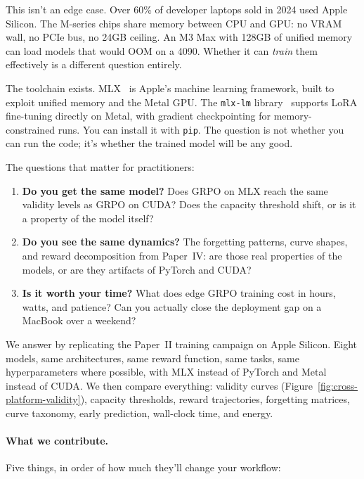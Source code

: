 \documentclass[11pt]{article}
\begin{document}
This isn't an edge case.  Over 60\% of developer laptops sold in 2024 used Apple Silicon.  The M-series chips share memory between CPU and GPU: no VRAM wall, no PCIe bus, no 24GB ceiling.  An M3 Max with 128GB of unified memory can load models that would OOM on a 4090.  Whether it can \emph{train} them effectively is a different question entirely.

The toolchain exists.  MLX~\citep{hannun2023mlx} is Apple's machine learning framework, built to exploit unified memory and the Metal GPU.  The \texttt{mlx-lm} library~\citep{mlxlm2024} supports LoRA fine-tuning directly on Metal, with gradient checkpointing for memory-constrained runs.  You can install it with \texttt{pip}.  The question is not whether you can run the code; it's whether the trained model will be any good.

The questions that matter for practitioners:

\begin{enumerate}[leftmargin=12pt]
    \item \textbf{Do you get the same model?}  Does GRPO on MLX reach the same validity levels as GRPO on CUDA?  Does the capacity threshold shift, or is it a property of the model itself?

    \item \textbf{Do you see the same dynamics?}  The forgetting patterns, curve shapes, and reward decomposition from Paper~IV: are those real properties of the models, or are they artifacts of PyTorch and CUDA?

    \item \textbf{Is it worth your time?}  What does edge GRPO training cost in hours, watts, and patience?  Can you actually close the deployment gap on a MacBook over a weekend?
\end{enumerate}

We answer by replicating the Paper~II training campaign on Apple Silicon.  Eight models, same architectures, same reward function, same tasks, same hyperparameters where possible, with MLX instead of PyTorch and Metal instead of CUDA.  We then compare everything: validity curves (Figure~\ref{fig:cross-platform-validity}), capacity thresholds, reward trajectories, forgetting matrices, curve taxonomy, early prediction, wall-clock time, and energy.

\paragraph{What we contribute.} Five things, in order of how much they'll change your workflow:
\end{document}
